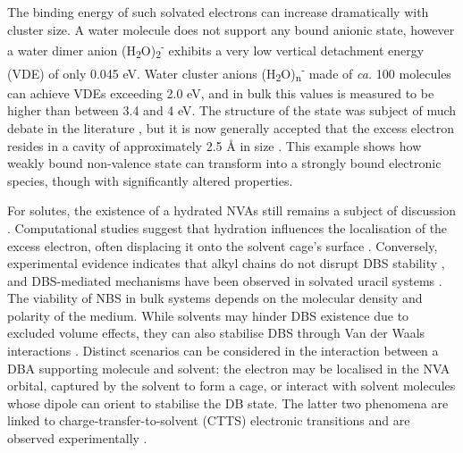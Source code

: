 The binding energy of such solvated electrons can increase dramatically with cluster size. A water molecule does not support any bound anionic state\cite{herbert2015quantum}, however a water dimer anion (H\textsubscript{2}O)\textsubscript{2}\textsuperscript{-} exhibits a very low vertical detachment energy (VDE) of only 0.045 eV\cite{coe1990photoelectron,lee1991negative}. Water cluster anions (H\textsubscript{2}O)\textsubscript{n}\textsuperscript{-} made of \emph{ca.} 100 molecules can achieve VDEs exceeding 2.0 eV\cite{verlet2005observation,ma2009low}, and in bulk this values is measured to be higher than between 3.4 and 4 eV\cite{ma2009low,coe2008photoelectron,siefermann2010binding}. The structure of the state was subject of much debate in the literature \cite{herbert2017hydrated,kumar2015simple,herbert2019structure,herbert2017hydrated,kevan1981solvated}, but it is now generally accepted that the excess electron resides in a cavity of approximately 2.5 \r{A} in size \cite{herbert2017hydrated,herbert2019structure}. This example shows how weakly bound non-valence state can transform into a strongly bound electronic species, though with significantly altered properties. 

For solutes, the existence of a hydrated NVAs still remains a subject of discussion \cite{anusiewicz2020fate,castellani2019stability,larsen2010does}. Computational studies suggest that hydration influences the localisation of the excess electron, often displacing it onto the solvent cage's surface \cite{anusiewicz2020fate}. Conversely, experimental evidence indicates that alkyl chains do not disrupt DBS stability \cite{castellani2019stability}, and DBS-mediated mechanisms have been observed in solvated uracil systems \cite{narayanan2024electron}. The viability of NBS in bulk systems depends on the molecular density and polarity of the medium. While solvents may hinder DBS existence due to excluded volume effects, they can also stabilise DBS through Van der Waals interactions \cite{bradforth2002excited,chen2000precursors}. Distinct scenarios can be considered in the interaction between a DBA supporting molecule and solvent: the electron may be localised in the NVA orbital, captured by the solvent to form a cage, or interact with solvent molecules whose dipole can orient to stabilise the DB state. The latter two phenomena are linked to charge-transfer-to-solvent (CTTS) electronic transitions and are observed experimentally \cite{staib1996reaction,chen2000precursors,bradforth2002excited,chen2008ultrafast,messina2013real,carter2023birth,lan2024dynamics}.

